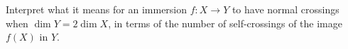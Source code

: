 Interpret what it means for an immersion $f: X \rightarrow Y$ to have normal crossings when $\dim Y = 2 \dim X$, in terms of the number of self-crossings of the image $f(X)$ in $Y$.
